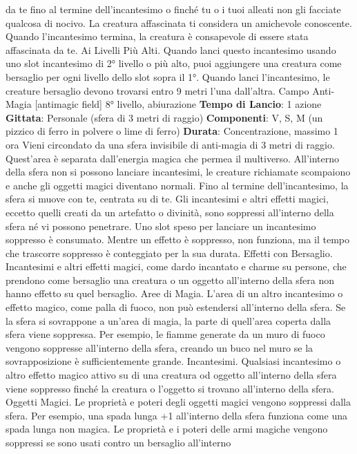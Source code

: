 \begin{multicols}{2}
da te fino al termine dell’incantesimo o finché tu o i tuoi
alleati non gli facciate qualcosa di nocivo. La creatura
affascinata ti considera un amichevole conoscente.
Quando l’incantesimo termina, la creatura è
consapevole di essere stata affascinata da te.
Ai Livelli Più Alti. Quando lanci questo incantesimo
usando uno slot incantesimo di 2° livello o più alto, puoi
aggiungere una creatura come bersaglio per ogni livello
dello slot sopra il 1°. Quando lanci l’incantesimo, le
creature bersaglio devono trovarsi entro 9 metri l’una
dall’altra.
Campo Anti-Magia
[antimagic field]
8° livello, abiurazione
\textbf{Tempo di Lancio}: 1 azione
\textbf{Gittata}: Personale (sfera di 3 metri di raggio)
\textbf{Componenti}: V, S, M (un pizzico di ferro in polvere o
lime di ferro)
\textbf{Durata}: Concentrazione, massimo 1 ora
Vieni circondato da una sfera invisibile di anti-magia di
3 metri di raggio. Quest’area è separata dall’energia
magica che permea il multiverso. All’interno della sfera
non si possono lanciare incantesimi, le creature
richiamate scompaiono e anche gli oggetti magici
diventano normali. Fino al termine dell’incantesimo, la
sfera si muove con te, centrata su di te.
Gli incantesimi e altri effetti magici, eccetto quelli creati
da un artefatto o divinità, sono soppressi all’interno
della sfera né vi possono penetrare. Uno slot speso per
lanciare un incantesimo soppresso è consumato.
Mentre un effetto è soppresso, non funziona, ma il
tempo che trascorre soppresso è conteggiato per la sua
durata.
Effetti con Bersaglio. Incantesimi e altri effetti magici,
come dardo incantato e charme su persone, che
prendono come bersaglio una creatura o un oggetto
all’interno della sfera non hanno effetto su quel
bersaglio.
Aree di Magia. L’area di un altro incantesimo o effetto
magico, come palla di fuoco, non può estendersi
all’interno della sfera. Se la sfera si sovrappone a
un’area di magia, la parte di quell’area coperta dalla
sfera viene soppressa. Per esempio, le fiamme
generate da un muro di fuoco vengono soppresse
all’interno della sfera, creando un buco nel muro se la
sovrapposizione è sufficientemente grande.
Incantesimi. Qualsiasi incantesimo o altro effetto
magico attivo su di una creatura od oggetto all’interno
della sfera viene soppresso finché la creatura o
l’oggetto si trovano all’interno della sfera.
Oggetti Magici. Le proprietà e poteri degli oggetti
magici vengono soppressi dalla sfera. Per esempio,
una spada lunga +1 all’interno della sfera funziona
come una spada lunga non magica.
Le proprietà e i poteri delle armi magiche vengono
soppressi se sono usati contro un bersaglio all’interno 

\end{multicols}
